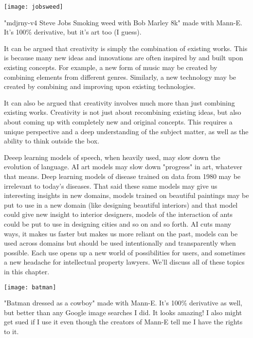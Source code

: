 \begin{marginfigure}[-5.5cm]
        \texttt{[image: jobsweed]}
        \caption{"mdjrny-v4 Steve Jobs Smoking weed with Bob Marley 8k" made with Mann-E. It's 100\% derivative, but it's art too (I guess).}
\end{marginfigure}

It can be argued that creativity is simply the combination of existing works. This is because many new ideas and innovations are often inspired by and built upon existing concepts. For example, a new form of music may be created by combining elements from different genres. Similarly, a new technology may be created by combining and improving upon existing technologies.

It can also be argued that creativity involves much more than just combining existing works. Creativity is not just about recombining existing ideas, but also about coming up with completely new and original concepts. This requires a unique perspective and a deep understanding of the subject matter, as well as the ability to think outside the box.  

Deeep learning models of speech, when heavily used, may slow down the evolution of language. AI art models may slow down "progress" in art, whatever that means. Deep learning models of disease trained on data from 1980 may be irrelevant to today's diseases. That said these same models may give us interesting insights in new domains, models trained on beautiful paintings may be put to use in a new domain (like designing beautiful interiors) and that model could give new insight to interior designers, models of the interaction of ants could be put to use in designing cities and so on and so forth. AI cuts many ways, it makes us faster but makes us more reliant on the past, models can be used across domains but should be used intentionally and transparently when possible. Each use opens up a new world of possibilities for users, and sometimes a new headache for intellectual property lawyers. We'll discuss all of these topics in this chapter.

\begin{marginfigure}[-5.5cm]
        \texttt{[image: batman]}
        \caption{"Batman dressed as a cowboy" made with Mann-E. It's 100\% derivative as well, but better than any Google image searches I did. It looks amazing! I also might get sued if I use it even though the creators of Mann-E tell me I have the rights to it.}
\end{marginfigure}

